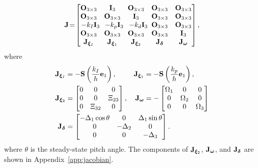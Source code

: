 \begin{equation}
    \mat{J} \!=\! \begin{bmatrix}
        \mat{O}_{3 \times 3} & \mat{I}_{3} & \mat{O}_{3 \times 3} & \mat{O}_{3 \times 3} & \mat{O}_{3 \times 3} \\
        \mat{O}_{3 \times 3} & \mat{O}_{3 \times 3} & \mat{I}_{3} & \mat{O}_{3 \times 3} & \mat{O}_{3 \times 3} \\
        -k_I \mat{I}_{3}\!\!\! & -k_p \mat{I}_{3}\!\!\! & -k_d \mat{I}_{3}\!\!\!\! & \mat{O}_{3 \times 3} & \mat{O}_{3 \times 3} \\
        \mat{O}_{3 \times 3} & \mat{O}_{3 \times 3} & \mat{O}_{3 \times 3} & \mat{O}_{3 \times 3} & \mat{I}_{3} \\
        \mat{J}_{\bs{\xi}_I} & \mat{J}_{\bs{\xi}_1} & \mat{J}_{\bs{\xi}_2} & \mat{J}_{\bs{\delta}} & \mat{J}_{\bs{\omega}}
    \end{bmatrix}, \label{eq:handpos_trajectory_jacobian}
\end{equation}
where
\begin{subequations}
    \begin{align}
        \mat{J}_{\bs{\xi}_I} &= -\mat{S}\left(\frac{k_I}{h}\mat{e}_1\right), &
        \mat{J}_{\bs{\xi}_1} &= -\mat{S}\left(\frac{k_p}{h}\mat{e}_1\right), \\
        \mat{J}_{\bs{\xi}_2} &= \begin{bmatrix}
            0 & 0 & 0 \\
            0 & 0 & {\Xi}_{23} \\
            0 & {\Xi}_{32} & 0
        \end{bmatrix}, &
        \mat{J}_{\bs{\omega}} &= - \begin{bmatrix}
            \Omega_1 & 0 & 0 \\
            0 & \Omega_2 & 0 \\
            0 & 0 & \Omega_3
        \end{bmatrix} \\            
        \mat{J}_{\bs{\delta}} &= \mathrlap{\begin{bmatrix}
            -\Delta_1\cos\theta & 0 & \Delta_1\sin\theta \\
            0 & -\Delta_2 & 0 \\
            0 & 0 & -\Delta_3
        \end{bmatrix}.}            
    \end{align}
    \label{eq:handpos_trajectory_jacobian_blocks}
\end{subequations}
\hspace*{-0.38em}where $\theta$ is the steady-state pitch angle.
The components of $\mathbf{J}_{\bm{\xi}_2}$, $\mathbf{J}_{\bm{\omega}}$, and $\mathbf{J}_{\bm{\delta}}$ are shown in Appendix~\ref{app:jacobian}.

